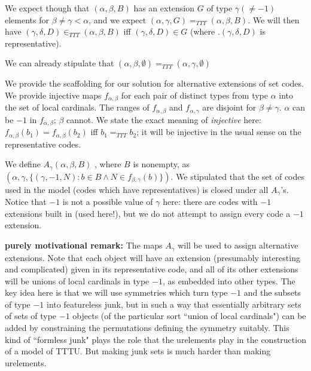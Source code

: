 \documentclass{slides}
\begin{document}
\begin{slide}

We expect though that $(\alpha,\beta,B)$ has an extension $G$ of type $\gamma(\neq -1)$ elements for $\beta\neq \gamma <\alpha$,
and we expect $(\alpha,\gamma,G) =_{TTT} (\alpha,\beta,B)$.  We will then have $(\gamma,\delta,D) \in_{TTT} (\alpha,\beta,B)$ iff $(\gamma,\delta,D)  \in G$ (where .$(\gamma,\delta,D)$ is representative).

We can already stipulate that $(\alpha,\beta,\emptyset)=_{TTT}(\alpha,\gamma,\emptyset)$

We provide the scaffolding for our solution for alternative extensions of set codes.  We provide injective maps $f_{\alpha,\beta}$ for
each pair of distinct types from  type $\alpha$ into the set of local cardinals.  The ranges of $f_{\alpha,\beta}$ and $f_{\alpha,\gamma}$ are disjoint for $\beta\neq \gamma$.   $\alpha$ can be $-1$ in $f_{\alpha,\beta}$; $\beta$ cannot.
We state the exact meaning of {\em injective\/} here:  $f_{\alpha,\beta}(b_1) = f_{\alpha,\beta}(b_2)$ iff $b_1 =_{TTT} b_2$; it will be injective in the usual sense on the representative codes.

\end{slide}

\begin{slide}

We define $A_{\gamma}(\alpha,\beta,B)$ , where $B$ is nonempty, as $(\alpha,\gamma,\{(\gamma,-1,N):b \in B\wedge N \in f_{\beta,\gamma}(b)\})$.  We stipulated that the set of codes used in the model (codes which have representatives) is closed under all $A_\gamma$'s.  Notice
that $-1$ is not a possible value of $\gamma$ here:  there are codes with $-1$ extensions built in (used here!), but we do not attempt to assign every code a $-1$ extension.

{\bf purely motivational remark:}  The maps $A_\gamma$ will be used to assign alternative extensions.  Note that each object will have an extension (presumably interesting and complicated) given in its representative code, and all of its other extensions will be unions of local cardinals in type $-1$, as embedded into other types.  The key idea here is that we will use symmetries which turn type $-1$ and the subsets of type $-1$ into featureless junk, but in such a way that essentially arbitrary sets of sets of type $-1$ objects
(of the particular sort ``union of local cardinals") can be added by constraining the permutations defining the symmetry suitably.
This kind of ``formless junk" plays the role that the urelements play in the construction of a model of TTTU.  But making junk sets is much harder than making urelements.

\end{slide}
\end{document}
